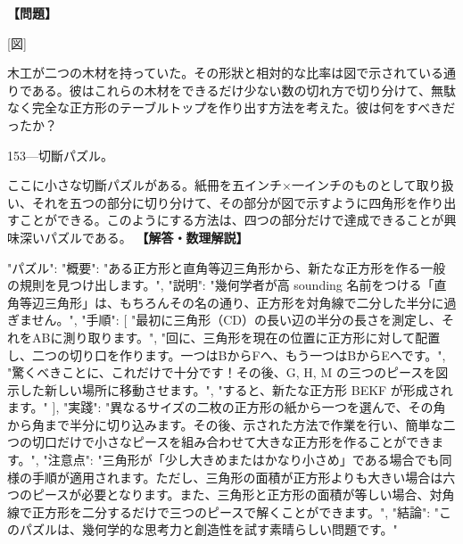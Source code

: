 \documentclass[10pt,a4paper,oneside,openany]{ltjsbook}
\begin{document}
\begin{tcolorbox}[colback=softblue,colframe=primaryblue,title=\textbf{第 152 問：ANOTHER JOINER'S PROBLEM.},arc=2mm,boxrule=1pt,breakable]
\textbf{【問題】}\par\vspace{0.3em}

[図]

木工が二つの木材を持っていた。その形狀と相対的な比率は図で示されている通りである。彼はこれらの木材をできるだけ少ない数の切れ方で切り分けて、無駄なく完全な正方形のテーブルトップを作り出す方法を考えた。彼は何をすべきだったか？

153—切斷パズル。

ここに小さな切斷パズルがある。紙冊を五インチ×一インチのものとして取り扱い、それを五つの部分に切り分けて、その部分が図で示すように四角形を作り出すことができる。このようにする方法は、四つの部分だけで達成できることが興味深いパズルである。
\tcblower
\textbf{【解答・数理解説】}\par\vspace{0.3em}
{
  "パズル": {
    "概要": "ある正方形と直角等辺三角形から、新たな正方形を作る一般の規則を見つけ出します。",
    "説明": "幾何学者が高 sounding 名前をつける「直角等辺三角形」は、もちろんその名の通り、正方形を対角線で二分した半分に過ぎません。",
    "手順": [
      "最初に三角形（CD）の長い辺の半分の長さを測定し、それをABに測り取ります。",
      "回に、三角形を現在の位置に正方形に対して配置し、二つの切り口を作ります。一つはBからFへ、もう一つはBからEへです。",
      "驚くべきことに、これだけで十分です！その後、G, H, M の三つのピースを図示した新しい場所に移動させます。",
      "すると、新たな正方形 BEKF が形成されます。"
    ],
    "実踐": "異なるサイズの二枚の正方形の紙から一つを選んで、その角から角まで半分に切り込みます。その後、示された方法で作業を行い、簡単な二つの切口だけで小さなピースを組み合わせて大きな正方形を作ることができます。",
    "注意点": "三角形が「少し大きめまたはかなり小さめ」である場合でも同様の手順が適用されます。ただし、三角形の面積が正方形よりも大きい場合は六つのピースが必要となります。また、三角形と正方形の面積が等しい場合、対角線で正方形を二分するだけで三つのピースで解くことができます。",
    "結論": "このパズルは、幾何学的な思考力と創造性を試す素晴らしい問題です。"
  }
}
\end{tcolorbox}
\end{document}
